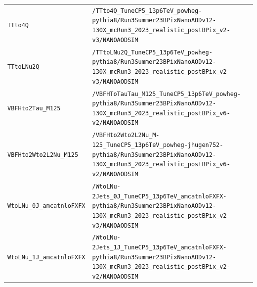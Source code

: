 \begin{longtable}{@{}>{\RaggedRight\arraybackslash}p{} >{\RaggedRight\arraybackslash}p{}@{}}
\addlinespace[2pt]
\texttt{TTto4Q} & \texttt{/\allowbreak{}TTto4Q\_\allowbreak{}TuneCP5\_\allowbreak{}13p6TeV\_\allowbreak{}powheg-\allowbreak{}pythia8/\allowbreak{}Run3Summer23BPixNanoAODv12-\allowbreak{}130X\_\allowbreak{}mcRun3\_\allowbreak{}2023\_\allowbreak{}realistic\_\allowbreak{}postBPix\_\allowbreak{}v2-\allowbreak{}v3/\allowbreak{}NANOAODSIM} \\
\addlinespace[2pt]
\texttt{TTtoLNu2Q} & \texttt{/\allowbreak{}TTtoLNu2Q\_\allowbreak{}TuneCP5\_\allowbreak{}13p6TeV\_\allowbreak{}powheg-\allowbreak{}pythia8/\allowbreak{}Run3Summer23BPixNanoAODv12-\allowbreak{}130X\_\allowbreak{}mcRun3\_\allowbreak{}2023\_\allowbreak{}realistic\_\allowbreak{}postBPix\_\allowbreak{}v2-\allowbreak{}v3/\allowbreak{}NANOAODSIM} \\
\addlinespace[2pt]
\texttt{VBFHto2Tau\_\allowbreak{}M125} & \texttt{/\allowbreak{}VBFHToTauTau\_\allowbreak{}M125\_\allowbreak{}TuneCP5\_\allowbreak{}13p6TeV\_\allowbreak{}powheg-\allowbreak{}pythia8/\allowbreak{}Run3Summer23BPixNanoAODv12-\allowbreak{}130X\_\allowbreak{}mcRun3\_\allowbreak{}2023\_\allowbreak{}realistic\_\allowbreak{}postBPix\_\allowbreak{}v6-\allowbreak{}v2/\allowbreak{}NANOAODSIM} \\
\addlinespace[2pt]
\texttt{VBFHto2Wto2L2Nu\_\allowbreak{}M125} & \texttt{/\allowbreak{}VBFHto2Wto2L2Nu\_\allowbreak{}M-\allowbreak{}125\_\allowbreak{}TuneCP5\_\allowbreak{}13p6TeV\_\allowbreak{}powheg-\allowbreak{}jhugen752-\allowbreak{}pythia8/\allowbreak{}Run3Summer23BPixNanoAODv12-\allowbreak{}130X\_\allowbreak{}mcRun3\_\allowbreak{}2023\_\allowbreak{}realistic\_\allowbreak{}postBPix\_\allowbreak{}v6-\allowbreak{}v2/\allowbreak{}NANOAODSIM} \\
\addlinespace[2pt]
\texttt{WtoLNu\_\allowbreak{}0J\_\allowbreak{}amcatnloFXFX} & \texttt{/\allowbreak{}WtoLNu-\allowbreak{}2Jets\_\allowbreak{}0J\_\allowbreak{}TuneCP5\_\allowbreak{}13p6TeV\_\allowbreak{}amcatnloFXFX-\allowbreak{}pythia8/\allowbreak{}Run3Summer23BPixNanoAODv12-\allowbreak{}130X\_\allowbreak{}mcRun3\_\allowbreak{}2023\_\allowbreak{}realistic\_\allowbreak{}postBPix\_\allowbreak{}v2-\allowbreak{}v3/\allowbreak{}NANOAODSIM} \\
\addlinespace[2pt]
\texttt{WtoLNu\_\allowbreak{}1J\_\allowbreak{}amcatnloFXFX} & \texttt{/\allowbreak{}WtoLNu-\allowbreak{}2Jets\_\allowbreak{}1J\_\allowbreak{}TuneCP5\_\allowbreak{}13p6TeV\_\allowbreak{}amcatnloFXFX-\allowbreak{}pythia8/\allowbreak{}Run3Summer23BPixNanoAODv12-\allowbreak{}130X\_\allowbreak{}mcRun3\_\allowbreak{}2023\_\allowbreak{}realistic\_\allowbreak{}postBPix\_\allowbreak{}v2-\allowbreak{}v2/\allowbreak{}NANOAODSIM} \\

\end{longtable}
